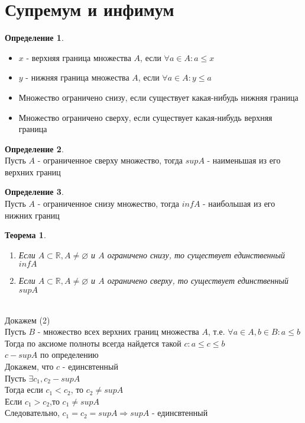 \documentclass[12pt,letterpaper]{report}
\makeatletter
\newtheorem*{theorem-non}{Теорема}
\theoremstyle{definition}
\newtheorem*{conj}{Определение}
\newcommand{\R}{\mathbb{R}}
\renewenvironment{proof}[1][\proofname]{%
   \par\pushQED{\qed}\normalfont%
   \topsep6\p@\@plus6\p@\relax
   \trivlist\item[\hskip\labelsep\bfseries#1\@addpunct{.}]%
   \ignorespaces
}{%
   \popQED\endtrivlist\@endpefalse
}
\makeatother
\begin{document}
\section{Супремум и инфимум}
\begin{conj}
    \quad \\
    \begin{itemize}
        \item[] $x$ - верхняя граница множества $A$, если $\forall a \in A: a \leqslant x$
        \item[] $y$ - нижняя граница множества $A$, если $\forall a \in A: y \leqslant a$ 
        \item[] Множество ограничено снизу, если существует какая-нибудь нижняя граница
        \item[] Множество ограничено сверху, если существует какая-нибудь верхняя граница
    \end{itemize}
\end{conj}
\begin{conj}
    \quad \\
    Пусть $A$ - ограниченное сверху множество, тогда $sup A$ - наименьшая из его верхних границ
\end{conj}
\begin{conj}
    \quad \\
    Пусть $A$ - ограниченное снизу множество, тогда $inf A$ - наибольшая из его нижних границ
\end{conj}
\begin{theorem-non}
    \quad \\
    \begin{enumerate}
        \item Если $A \subset \R, A \neq \varnothing $ и $ A $ ограничено снизу, то существует единственный $inf A$
        \item Если $A \subset \R, A \neq \varnothing $ и $ A $ ограничено сверху, то существует единственный $sup A$
    \end{enumerate}
\end{theorem-non}
\begin{proof}
    \quad \\
    Докажем (2) \\
    Пусть $B$ - множество всех верхних границ множества $A$, т.е. $\forall a \in A, b \in B: a \leqslant b$ \\
    Тогда по аксиоме полноты всегда найдется такой $c: a \leqslant c \leqslant b$ \\
    $c - sup A$ по определению \\
    Докажем, что $c$ - единсвтенный \\
    Пусть $\exists c_1, c_2 - sup A$ \\
    Тогда если $c_1 < c_2$, то $c_2 \neq sup A$ \\
    Если $c_1 > c_2$,то $c_1 \neq sup A$ \\
    Следовательно, $c_1 = c_2 = sup A \Longrightarrow sup A$ - единсвтенный  
\end{proof}
\end{document}
